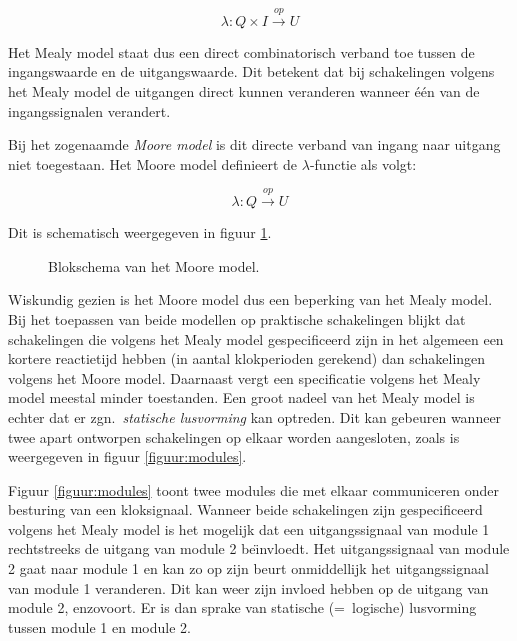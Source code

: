 \begin{equation}
\lambda : Q \times I \stackrel{op}{\rightarrow} U
\end{equation}

Het Mealy model staat dus een direct combinatorisch
verband toe tussen de ingangswaarde en de uitgangswaarde.
Dit betekent dat bij schakelingen volgens het Mealy model de uitgangen
direct kunnen veranderen wanneer \'e\'en van de ingangssignalen verandert.

Bij het zogenaamde {\em Moore model\/} is dit directe verband
van ingang naar uitgang niet toegestaan.
Het Moore model definieert de $\lambda$-functie als volgt:

\begin{equation}
\lambda : Q \stackrel{op}{\rightarrow} U
\end{equation}

Dit is schematisch weergegeven in figuur \ref{figuur:moore_mod}.

\begin{figure}[bth]
\centerline{}
\caption{Blokschema van het Moore model.}
\label{figuur:moore_mod}
\end{figure}

Wiskundig gezien is het Moore model dus een beperking van
het Mealy model.
Bij het toepassen van beide modellen op praktische schakelingen blijkt
dat schakelingen die volgens het Mealy model gespecificeerd zijn in
het algemeen een kortere reactietijd hebben
(in aantal klokperioden gerekend) dan schakelingen volgens    
het Moore model.
Daarnaast vergt een specificatie volgens het Mealy model meestal
minder toestanden.
Een groot nadeel van het Mealy model is echter dat er
zgn.\ {\em statische lusvorming\/} kan optreden. 
Dit kan gebeuren
wanneer twee apart ontworpen schakelingen op elkaar worden aangesloten,
zoals is weergegeven
in figuur \ref{figuur:modules}.

Figuur \ref{figuur:modules} toont twee modules die met elkaar communiceren onder
besturing van een kloksignaal.
Wanneer beide schakelingen zijn gespecificeerd volgens het Mealy model
is het mogelijk dat een uitgangssignaal van module 1
rechtstreeks de uitgang van module 2 be\"{\i}nvloedt.
Het uitgangssignaal van module 2 gaat naar module 1 en kan zo
op zijn beurt onmiddellijk het uitgangssignaal van module 1 veranderen.
Dit kan weer zijn invloed hebben op de uitgang van module 2, enzovoort.
Er is dan sprake van statische (=~logische) lusvorming tussen 
module 1 en module 2.

